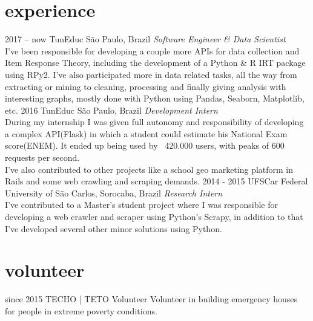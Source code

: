 \documentclass[]{friggeri-cv}
\begin{document}
\section{experience}

\begin{entrylist}
	\entry
		{2017 -- now}
		{TunEduc}
		{São Paulo, Brazil}
		{\emph{Software Engineer \& Data Scientist}\\
		I've been responsible for developing a couple more APIs for data collection and Item Response Theory, including the development of a Python \& R IRT package using RPy2.
		I've also participated more in data related tasks, all the way from extracting or mining to cleaning, processing and finally giving analysis with interesting graphs, mostly done with Python using Pandas, Seaborn, Matplotlib, etc.
		}
	\entry
		{2016}
		{TunEduc}
		{São Paulo, Brazil}
		{\emph{Development Intern}\\
		During my internship I was given full autonomy and responsibility of developing a complex API(Flask) in which a student could estimate his National Exam score(ENEM). It ended up being used by ~420.000 users, with peaks of 600 requests per second.\\
		I've also contributed to other projects like a school geo marketing platform in Rails and some web crawling and scraping demands.}
	\entry
		{2014 - 2015}
		{UFSCar}
		{Federal University of São Carlos, Sorocaba, Brazil}
		{\emph{Research Intern}\\
		I've contributed to a Master's student project where I was responsible for developing a web crawler and scraper using Python's Scrapy, in addition to that I've developed several other minor solutions using Python. 
		}
		

		
\end{entrylist}


\section{volunteer}

\begin{entrylist}
  \entry
    {since 2015}
    {TECHO | TETO}
    {Volunteer}
    {Volunteer in building emergency houses for people in extreme poverty conditions.}
\end{entrylist}

\end{document}
